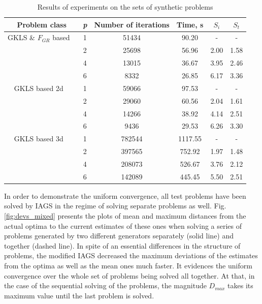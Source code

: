 \documentclass[runningheads]{llncs}
\begin{document}
\begin{table}
  \centering
  \caption{Results of experiments on the sets of synthetic problems}
  \label{tab:speedup}
  \begin{tabular}{c|c|cccc}
    Problem class & \textit{p} & Number of iterations & Time, s & \(S_i\) & \(S_t\)   \\
    \hline
    GKLS \& \(F_{GR}\) based \
      & 1 & 51434 & 90.20 & -    & - \\
      & 2 & 25698 & 56.96 & 2.00 & 1.58 \\
      & 4 & 13015 & 36.67 & 3.95 & 2.46 \\
      & 6 & 8332  & 26.85 & 6.17 & 3.36 \\
    \hline
    GKLS based 2d \
      & 1 & 59066 & 97.53 & -    & - \\
      & 2 & 29060 & 60.56 & 2.04 & 1.61 \\
      & 4 & 14266 & 38.92 & 4.14 & 2.51 \\
      & 6 & 9436  & 29.53 & 6.26 & 3.30 \\
    \hline
    GKLS based 3d \
      & 1 & 782544 & 1117.55 & -    & - \\
      & 2 & 397565 & 752.92  & 1.97 & 1.48 \\
      & 4 & 208073 & 526.67  & 3.76 & 2.12 \\
      & 6 & 142089 & 445.45  & 5.50 & 2.51 \\
    \hline
  \end{tabular}
\end{table}

In order to demonstrate the uniform convergence, all test problems have been solved by IAGS
in the regime of solving separate problems as well.
Fig. \ref{fig:devs_mixed} presents the plots of mean and maximum distances from the actual
optima to the current estimates of these ones when solving a series of problems generated by
two different generators separately (solid line) and together (dashed line).
In spite of an essential differences in the structure of problems, the modified IAGS decreased
the maximum deviations of the estimates from the optima as well as the mean ones much faster.
It evidences the uniform convergence over the whole set of problems being solved all together.
At that, in the case of the sequential solving of the problems, the magnitude \(D_{max}\) takes
its maximum value until the last problem is solved.
\end{document}
